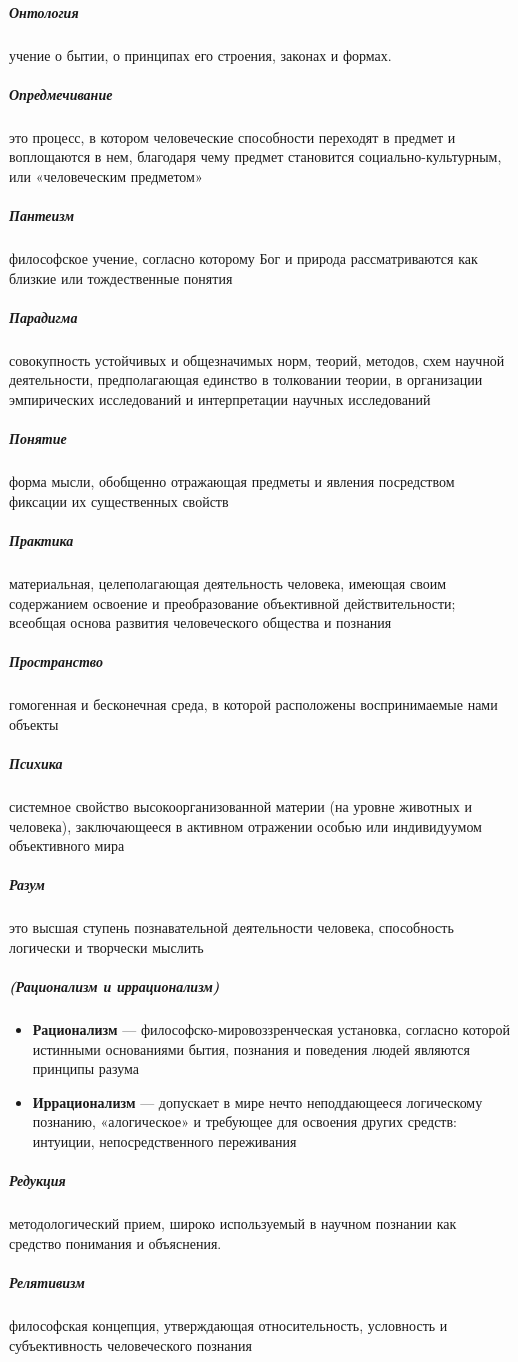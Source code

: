 \documentclass[a4paper, 12pt]{article}
\theoremstyle{plain} %
\theoremstyle{definition} %
\theoremstyle{remark} %
\begin{document}
\subparagraph{Онтология}
	учение о бытии, о принципах его строения, законах и формах.

\subparagraph{Опредмечивание}
	это процесс, в котором человеческие способности переходят в предмет и воплощаются в нем, благодаря чему предмет становится социально-культурным, или «человеческим предметом»

\subparagraph{Пантеизм}
	философское учение, согласно которому Бог и природа рассматриваются как близкие или тождественные понятия

\subparagraph{Парадигма}
	 совокупность устойчивых и общезначимых норм, теорий, методов, схем научной деятельности, предполагающая единство в толковании теории, в организации эмпирических исследований и интерпретации научных исследований

\subparagraph{Понятие}
	форма мысли, обобщенно отражающая предметы и явления посредством фиксации их существенных свойств

\subparagraph{Практика}
	материальная, целеполагающая деятельность человека, имеющая своим содержанием освоение и преобразование объективной действительности; всеобщая основа развития человеческого общества и познания

\subparagraph{Пространство}
	 гомогенная и бесконечная среда, в которой расположены воспринимаемые нами объекты

\subparagraph{Психика}
	системное свойство высокоорганизованной материи
	(на уровне животных и человека), заключающееся в активном отражении особью или индивидуумом объективного мира

\subparagraph{Разум}
	это высшая ступень познавательной деятельности человека, способность логически и творчески мыслить

\subparagraph{(Рационализм и иррационализм)}
\begin{itemize}
		\item[]\textbf{Рационализм} --- философско-мировоззренческая установка, согласно которой истинными основаниями бытия, познания и поведения людей являются принципы разума
		\item[]\textbf{Иррационализм} --- допускает в мире нечто неподдающееся логическому познанию, «алогическое» и требующее для освоения других средств: интуиции, непосредственного переживания
\end{itemize}
\subparagraph{Редукция}
	методологический прием, широко используемый в научном познании как средство понимания и объяснения.

\subparagraph{Релятивизм}
	философская концепция, утверждающая относительность, условность и субъективность человеческого познания
\end{document}
